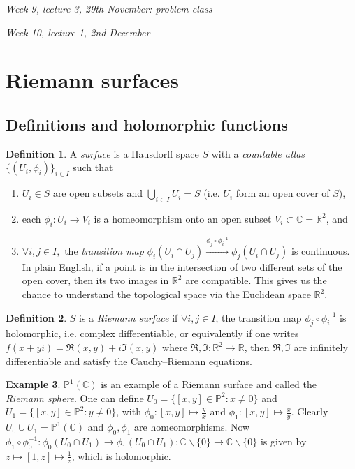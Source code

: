 \documentclass{article}
\newcommand{\R}{\mathbb{R}}
\newcommand{\C}{\mathbb{C}}
\newcommand{\p}{\mathbb{P}}
\theoremstyle{definition}
\newtheorem{defn}{Definition}[subsection]
\newtheorem{example}[defn]{Example}
\begin{document}
\begin{flushright}
\textit{Week 9, lecture 3, 29th November: problem class}
\end{flushright}

\begin{flushright}
\textit{Week 10, lecture 1, 2nd December}
\end{flushright}

\section{Riemann surfaces}
\subsection{Definitions and holomorphic functions}
\begin{defn}
A \textit{surface} is a Hausdorff space $S$ with a \textit{countable atlas} $\{(U_i,\phi_i)\}_{i\in I}$ such that
\begin{enumerate}
\item $U_i\in S$ are open subsets and $\bigcup_{i\in I}U_i=S$ (i.e. $U_i$ form an open cover of $S$),
\item each $\phi_i:U_i\rightarrow V_i$ is a homeomorphism onto an open subset $V_i\subset\C=\R^2$, and
\item $\forall i,j\in I,$ the \textit{transition map} $\phi_i(U_i\cap U_j)\xrightarrow{\phi_j\circ\phi_i^{-1}} \phi_j(U_i\cap U_j)$ is continuous. In plain English, if a point is in the intersection of two different sets of the open cover, then its two images in $\R^2$ are compatible. This gives us the chance to understand the topological space via the Euclidean space $\R^2$.
\end{enumerate}
\end{defn}

\begin{defn}
$S$ is a \textit{Riemann surface} if $\forall i,j\in I$, the transition map $\phi_j\circ\phi_i^{-1}$ is holomorphic, i.e. complex differentiable, or equivalently if one writes $f(x+yi)=\Re(x,y)+i\Im(x,y)$ where $\Re,\Im:\R^2\rightarrow \R$, then $\Re,\Im$ are infinitely differentiable and satisfy the Cauchy--Riemann equations.
\end{defn}

\begin{example}
\label{example:P1CasRiemannsurf}
$\p^1(\C)$ is an example of a Riemann surface and called the \textit{Riemann sphere}. One can define $U_0=\{[x,y]\in\p^2:x\neq 0\}$ and $U_1=\{[x,y]\in\p^2:y\neq 0\}$, with $\phi_0:[x,y]\mapsto\frac{y}{x}$ and $\phi_1:[x,y]\mapsto\frac{x}{y}$. Clearly $U_0\cup U_1=\p^1(\C)$ and $\phi_0,\phi_1$ are homeomorphisms. Now $\phi_1\circ\phi_0^{-1}:\phi_0(U_0\cap U_1)\rightarrow\phi_1(U_0\cap U_1):\C\backslash\{0\}\rightarrow\C\backslash\{0\}$ is given by $z\mapsto[1,z]\mapsto\frac{1}{z}$, which is holomorphic.
\end{example}
\end{document}
